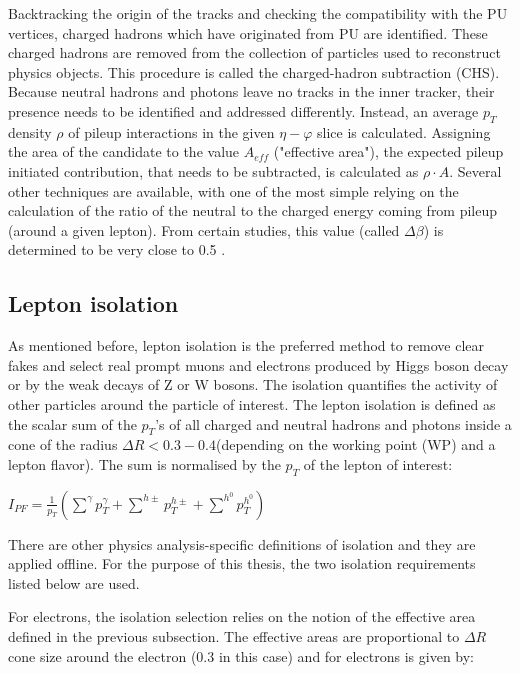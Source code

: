 Backtracking the origin of the tracks and checking the compatibility with the PU vertices, charged hadrons which have originated from PU are identified. These charged hadrons are removed from the collection of particles used to reconstruct physics objects. This procedure is called the charged-hadron subtraction (CHS). Because neutral hadrons and photons leave no tracks in the inner tracker, their presence needs to be identified and addressed differently. Instead, an average  $p_T$ density $\rho$ of pileup interactions in the given $\eta - \varphi$ slice is calculated. Assigning the area of the candidate to the value $A_{eff}$ ("effective area"), the expected pileup initiated contribution, that needs to be subtracted, is calculated as $\rho \cdot A$. Several other techniques are available, with one of the most simple relying on the calculation of the ratio of the neutral to the charged energy coming from pileup (around a given lepton). From certain studies, this value (called $\Delta \beta$) is determined to be very close to 0.5 \cite{PU_mitigation}. 

\subsection{Lepton isolation}\label{sec:isolation}

As mentioned before, lepton isolation is the preferred method to remove clear fakes and select real  prompt  muons  and  electrons  produced  by Higgs boson decay or by the weak decays of Z or W bosons. The isolation quantifies the activity of other particles around the particle of interest. The lepton isolation is defined as the scalar sum of the $p_T$'s of all charged and neutral hadrons and photons inside a cone of the radius $\Delta R <  0.3 - 0.4 $(depending on the working point (WP) and a lepton flavor). The sum is normalised by the $p_T$ of the lepton of interest:

$I_{PF} = \frac{1}{p_T} (\sum^\gamma p^\gamma_T + \sum^{h \pm} p^{h \pm}_T + \sum^{h^0} p^{h^0 }_T)$

There are other physics analysis-specific definitions of isolation and they are applied offline. For the purpose of this thesis, the two isolation requirements listed below are used.

For electrons, the isolation selection relies on the notion of the effective area defined in the previous subsection. The effective areas are proportional to $\Delta R$ cone size around the electron (0.3 in this case) and for electrons is given by: 

